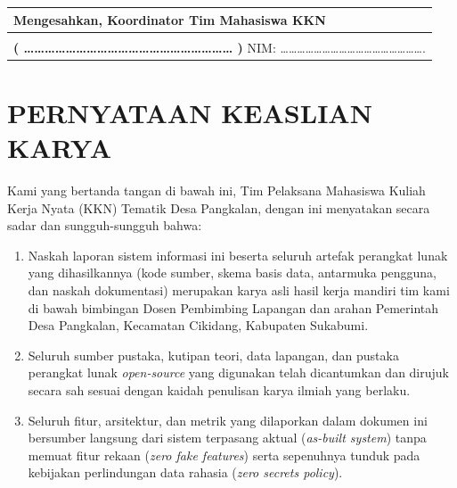 \documentclass[
  indonesian,
  12pt,
]{report}
\newcounter{none} %
\providecommand{\tightlist}{%
  \setlength{\itemsep}{0pt}\setlength{\parskip}{0pt}}
\begin{document}
\vspace{1cm}

{\def\LTcaptype{none} %
\begin{longtable}[]{@{}
  >{\centering\arraybackslash}p{}@{}}
\toprule\noalign{}
\begin{minipage}[b]{\linewidth}\centering
Mengesahkan, \textbf{Koordinator Tim Mahasiswa KKN}
\end{minipage} \\
\midrule\noalign{}
\endhead
\bottomrule\noalign{}
\endlastfoot
\vspace{2.2cm} \\
\textbf{(
\ldots\ldots\ldots\ldots\ldots\ldots\ldots\ldots\ldots\ldots\ldots\ldots\ldots\ldots\ldots\ldots\ldots\ldots\ldots\ldots{}
)} NIM:
\ldots\ldots\ldots\ldots\ldots\ldots\ldots\ldots\ldots\ldots\ldots\ldots\ldots\ldots\ldots\ldots\ldots. \\
\end{longtable}
}

\newpage

\chapter*{PERNYATAAN KEASLIAN KARYA}\label{pernyataan-keaslian-karya}

Kami yang bertanda tangan di bawah ini, Tim Pelaksana Mahasiswa Kuliah
Kerja Nyata (KKN) Tematik Desa Pangkalan, dengan ini menyatakan secara
sadar dan sungguh-sungguh bahwa:

\begin{enumerate}
\def\labelenumi{\arabic{enumi}.}
\tightlist
\item
  Naskah laporan sistem informasi ini beserta seluruh artefak perangkat
  lunak yang dihasilkannya (kode sumber, skema basis data, antarmuka
  pengguna, dan naskah dokumentasi) merupakan karya asli hasil kerja
  mandiri tim kami di bawah bimbingan Dosen Pembimbing Lapangan dan
  arahan Pemerintah Desa Pangkalan, Kecamatan Cikidang, Kabupaten
  Sukabumi.
\item
  Seluruh sumber pustaka, kutipan teori, data lapangan, dan pustaka
  perangkat lunak \emph{open-source} yang digunakan telah dicantumkan
  dan dirujuk secara sah sesuai dengan kaidah penulisan karya ilmiah
  yang berlaku.
\item
  Seluruh fitur, arsitektur, dan metrik yang dilaporkan dalam dokumen
  ini bersumber langsung dari sistem terpasang aktual (\emph{as-built
  system}) tanpa memuat fitur rekaan (\emph{zero fake features}) serta
  sepenuhnya tunduk pada kebijakan perlindungan data rahasia (\emph{zero
  secrets policy}).
\end{enumerate}
\end{document}
